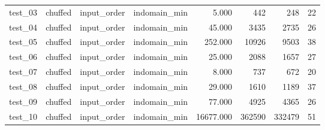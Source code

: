 \begin{longtable}{l l l l r r r r}
    test\_03         & chuffed         & input\_order      & indomain\_min     & 5.000              & 442            & 248               & 22             \\
    test\_04         & chuffed         & input\_order      & indomain\_min     & 45.000             & 3435           & 2735              & 26             \\
    test\_05         & chuffed         & input\_order      & indomain\_min     & 252.000            & 10926          & 9503              & 38             \\
    test\_06         & chuffed         & input\_order      & indomain\_min     & 25.000             & 2088           & 1657              & 27             \\
    test\_07         & chuffed         & input\_order      & indomain\_min     & 8.000              & 737            & 672               & 20             \\
    test\_08         & chuffed         & input\_order      & indomain\_min     & 29.000             & 1610           & 1189              & 37             \\
    test\_09         & chuffed         & input\_order      & indomain\_min     & 77.000             & 4925           & 4365              & 26             \\
    test\_10         & chuffed         & input\_order      & indomain\_min     & 16677.000          & 362590         & 332479            & 51             \\
\end{longtable}

